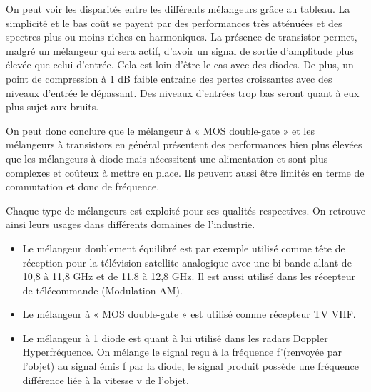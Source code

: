 \documentclass{article}
\begin{document}
On peut voir les disparités entre les différents mélangeurs grâce au tableau. La simplicité et le bas coût se payent par des performances très atténuées et des spectres plus ou moins riches en harmoniques. La présence de transistor permet, malgré un mélangeur qui sera actif, d'avoir un signal de sortie d'amplitude plus élevée que celui d'entrée. Cela est loin d'être le cas avec des diodes.
De plus, un point de compression à 1 dB faible entraine des pertes croissantes avec des niveaux d'entrée le dépassant. Des niveaux d'entrées trop bas seront quant à eux plus sujet aux bruits.

On peut donc conclure que le mélangeur à « MOS double-gate » et les mélangeurs à transistors en général présentent des performances bien plus élevées que les mélangeurs à diode mais nécessitent une alimentation et sont plus complexes et coûteux à mettre en place. Ils peuvent aussi être limités en terme de commutation et donc de fréquence.



Chaque type de mélangeurs est exploité pour ses qualités respectives. On retrouve ainsi leurs usages dans différents domaines de l'industrie.

\begin{itemize}
\item Le mélangeur doublement équilibré est par exemple utilisé comme tête de réception pour la télévision satellite analogique avec une bi-bande allant de 10,8 à 11,8 GHz et de 11,8 à 12,8 GHz.
Il est aussi utilisé dans les récepteur de télécommande (Modulation AM).
\item Le mélangeur à « MOS double-gate » est utilisé comme récepteur TV VHF.
\item Le mélangeur à 1 diode est quant à lui utilisé dans les radars Doppler Hyperfréquence. On mélange le signal reçu à la fréquence f’(renvoyée par l'objet) au signal émis f par la diode, le signal produit possède une fréquence différence liée à la vitesse v de l'objet. 
\end{itemize}

















%
%
%
%
\end{document}

